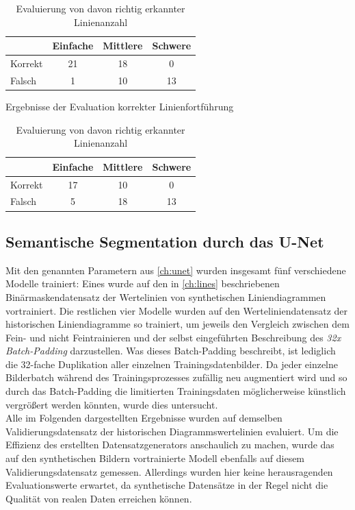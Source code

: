 \begin{table}[H]
    \centering
    \begin{minipage}{0.475\textwidth}
        \centering
        \begin{tabular}{|l|c|c|c|}
            \hline
            \rowcolor[HTML]{EFEFEF}
                    & Einfache & Mittlere & Schwere \\ \hline
            Korrekt & 21       & 18       & 0       \\ \hline
            Falsch  & 1        & 10       & 13      \\ \hline
        \end{tabular}
        \caption{Ergebnisse der Evaluation korrekter Linienfortführung}
    \end{minipage}%
    \hfill
    \begin{minipage}{0.475\textwidth}
        \centering
        \begin{tabular}{|l|c|c|c|}
            \hline
            \rowcolor[HTML]{EFEFEF}
                    & Einfache & Mittlere & Schwere \\ \hline
            Korrekt & 17       & 10       & 0       \\ \hline
            Falsch  & 5        & 18       & 13      \\ \hline
        \end{tabular}
        \caption{Evaluierung von davon richtig erkannter Linienanzahl}
    \end{minipage}
\end{table}

\subsection{Semantische Segmentation durch das U-Net}
\label{ch:eval_unet}

Mit den genannten Parametern aus \ref{ch:unet} wurden insgesamt fünf verschiedene Modelle trainiert: Eines wurde auf den in \ref{ch:lines} beschriebenen Binärmaskendatensatz der Wertelinien von synthetischen Liniendiagrammen vortrainiert. Die restlichen vier Modelle wurden auf den Werteliniendatensatz der historischen Liniendiagramme so trainiert, um jeweils den Vergleich zwischen dem Fein- und nicht Feintrainieren und der selbst eingeführten Beschreibung des \emph{32x Batch-Padding} darzustellen. Was dieses Batch-Padding beschreibt, ist lediglich die 32-fache Duplikation aller einzelnen Trainingsdatenbilder. Da jeder einzelne Bilderbatch während des Trainingsprozesses zufällig neu augmentiert wird und so durch das Batch-Padding die limitierten Trainingsdaten möglicherweise künstlich vergrößert werden könnten, wurde dies untersucht.
\\
Alle im Folgenden dargestellten Ergebnisse wurden auf demselben Validierungsdatensatz der historischen Diagrammswertelinien evaluiert. Um die Effizienz des erstellten Datensatzgenerators anschaulich zu machen, wurde das auf den synthetischen Bildern vortrainierte Modell ebenfalls auf diesem Validierungsdatensatz gemessen. Allerdings wurden hier keine herausragenden Evaluationswerte erwartet, da synthetische Datensätze in der Regel nicht die Qualität von realen Daten erreichen können.


